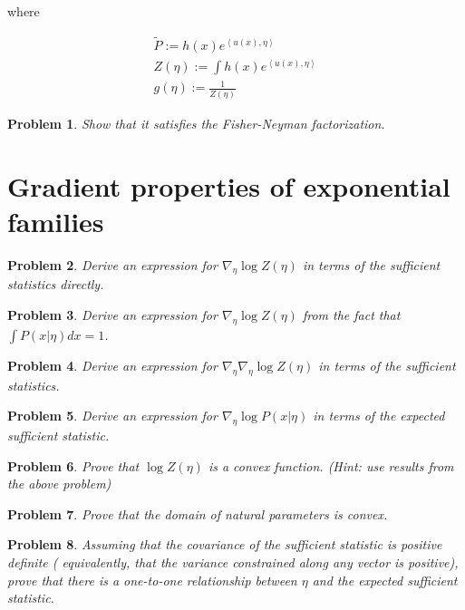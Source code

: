 \documentclass[a4paper]{article}
\newtheorem{problem}{Problem}[section]
\begin{document}
where 

\begin{equation}
  \begin{split}
    \tilde{P} := h(x) e^{ \left< u(x), \eta \right> } \\
    Z(\eta) := \int h(x) e^{ \left< u(x), \eta \right> } \\
    g(\eta) := \frac{1}{Z(\eta)}
  \end{split}
  \label{}
\end{equation}

\begin{problem}
Show that it satisfies the Fisher-Neyman factorization.
\end{problem}

\section{Gradient properties of exponential families}


\begin{problem}
Derive an expression for $ \nabla_\eta \log Z(\eta) $ in terms of the sufficient statistics directly.
\end{problem}

\begin{problem}
Derive an expression for $ \nabla_\eta \log Z(\eta) $ from the fact that $ \int P( x \vert \eta) dx = 1 $.
\end{problem}

\begin{problem}
Derive an expression for $ \nabla_\eta \nabla_\eta \log Z(\eta) $ in terms of the sufficient statistics.
\end{problem}

\begin{problem}
Derive an expression for $ \nabla_\eta \log P( x \vert \eta ) $ in terms of the expected sufficient statistic.
\end{problem}

\begin{problem}
Prove that $ \log Z(\eta)$ is a convex function.
(Hint: use results from the above problem)
\end{problem}

\begin{problem}
Prove that the domain of natural parameters is convex.
\end{problem}

\begin{problem}
Assuming that the covariance of the sufficient statistic is positive definite ( equivalently, that the variance constrained along any vector is positive), prove that there is a one-to-one relationship between $\eta$ and the expected sufficient statistic.
\end{problem}
\end{document}
